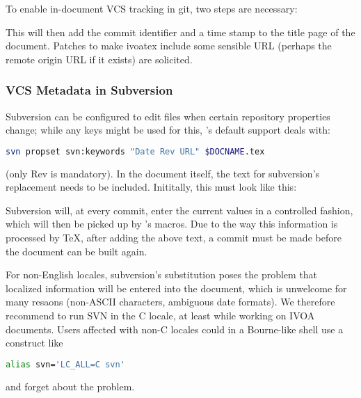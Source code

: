 \documentclass[11pt,a4paper]{ivoa}
\begin{document}
To enable in-document VCS tracking in git, two steps are necessary:


This will then add the commit identifier and a time stamp to the title
page of the document.  Patches to make ivoatex include some sensible URL
(perhaps the remote origin URL if it exists) are solicited.

\subsubsection{VCS Metadata in Subversion}

Subversion can be configured to edit files when certain repository
properties change; while any keys might be used for this, \ivoatex's
default support deals with:

\begin{lstlisting}[language=sh]
svn propset svn:keywords "Date Rev URL" $DOCNAME.tex
\end{lstlisting}

(only Rev is mandatory).
In the document itself, the text for subversion's replacement needs to
be included.  Inititally, this must look like this:



Subversion will, at every commit, enter the current values in a
controlled fashion, which will then be picked up by \ivoatex's macros.
Due to the way this information is processed by \TeX, after adding the above
text, a commit must be made before the document can be built again.

For non-English locales, subversion's substitution poses the problem that
localized information will be entered into the document, which is
unwelcome for many resaons (non-ASCII characters, ambiguous date
formats).  We therefore recommend to run SVN in the C
locale, at least while working on IVOA documents.  Users affected with
non-C locales
could in a Bourne-like shell use a construct like
\begin{lstlisting}[language=sh]
alias svn='LC_ALL=C svn'
\end{lstlisting}
and forget about the problem.
\end{document}
